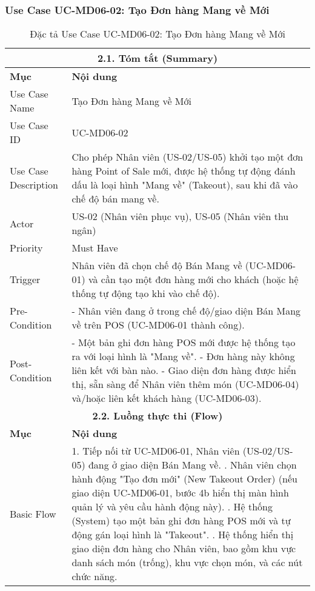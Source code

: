 \subsubsection{Use Case UC-MD06-02: Tạo Đơn hàng Mang về Mới}
\begin{longtable}{|m{4cm}|p{11cm}|}
\caption{Đặc tả Use Case UC-MD06-02: Tạo Đơn hàng Mang về Mới} \label{tab:uc_md06_02_final_v3} \\
\hline
\multicolumn{2}{|c|}{\textbf{2.1. Tóm tắt (Summary)}} \\
\hline
\textbf{Mục} & \textbf{Nội dung} \\
\hline
\endhead %
\hline
\endfoot %
\hline
\endlastfoot %
Use Case Name & Tạo Đơn hàng Mang về Mới \\
\hline
Use Case ID & UC-MD06-02 \\
\hline
Use Case Description & Cho phép Nhân viên (US-02/US-05) khởi tạo một đơn hàng Point of Sale mới, được hệ thống tự động đánh dấu là loại hình "Mang về" (Takeout), sau khi đã vào chế độ bán mang về. \\
\hline
Actor & US-02 (Nhân viên phục vụ), US-05 (Nhân viên thu ngân) \\
\hline
Priority & Must Have \\
\hline
Trigger & Nhân viên đã chọn chế độ Bán Mang về (UC-MD06-01) và cần tạo một đơn hàng mới cho khách (hoặc hệ thống tự động tạo khi vào chế độ). \\
\hline
Pre-Condition & - Nhân viên đang ở trong chế độ/giao diện Bán Mang về trên POS (UC-MD06-01 thành công). \\
\hline
Post-Condition & - Một bản ghi đơn hàng POS mới được hệ thống tạo ra với loại hình là "Mang về". \newline - Đơn hàng này không liên kết với bàn nào. \newline - Giao diện đơn hàng được hiển thị, sẵn sàng để Nhân viên thêm món (UC-MD06-04) và/hoặc liên kết khách hàng (UC-MD06-03). \\
\hline
\multicolumn{2}{|c|}{\textbf{2.2. Luồng thực thi (Flow)}} \\
\hline
\textbf{Mục} & \textbf{Nội dung} \\
\hline
Basic Flow & 1. Tiếp nối từ UC-MD06-01, Nhân viên (US-02/US-05) đang ở giao diện Bán Mang về. \newline 2. Nhân viên chọn hành động "Tạo đơn mới" (New Takeout Order) (nếu giao diện UC-MD06-01, bước 4b hiển thị màn hình quản lý và yêu cầu hành động này). \newline 3. Hệ thống (System) tạo một bản ghi đơn hàng POS mới và tự động gán loại hình là "Takeout". \newline 4. Hệ thống hiển thị giao diện đơn hàng cho Nhân viên, bao gồm khu vực danh sách món (trống), khu vực chọn món, và các nút chức năng. \\

\end{longtable}
